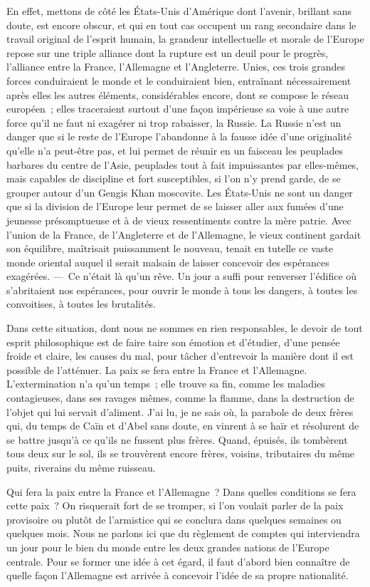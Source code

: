 \documentclass[french,twoside]{book} %
\begin{document}
En effet, mettons de côté les États-Unis d’Amérique dont l’avenir, brillant sans doute, est encore obscur, et qui en tout cas occupent un rang secondaire dans le travail original de l’esprit humain, la grandeur intellectuelle et morale de l’Europe repose sur une triple alliance dont la rupture est un deuil pour le progrès, l’alliance entre la France, l’Allemagne et l’Angleterre. Unies, ces trois grandes forces conduiraient le monde et le conduiraient bien, entraînant nécessairement après elles les autres éléments, considérables encore, dont se compose le réseau européen ; elles traceraient surtout d’une façon impérieuse sa voie à une autre force qu’il ne faut ni exagérer ni trop rabaisser, la Russie. La Russie n’est un danger que si le reste de l’Europe l’abandonne à la fausse idée d’une originalité qu’elle n’a peut-être pas, et lui permet de réunir en un faisceau les peuplades barbares du centre de l’Asie, peuplades tout à fait impuissantes par elles-mêmes, mais capables de discipline et fort susceptibles, si l’on n’y prend garde, de se grouper autour d’un Gengis Khan moscovite. Les États-Unis ne sont un danger que si la division de l’Europe leur permet de se laisser aller aux fumées d’une jeunesse présomptueuse et à de vieux ressentiments contre la mère patrie. Avec l’union de la France, de l’Angleterre et de l’Allemagne, le vieux continent gardait son équilibre, maîtrisait puissamment le nouveau, tenait en tutelle ce vaste monde oriental auquel il serait malsain de laisser concevoir des espérances exagérées. — Ce n’était là qu’un rêve. Un jour a suffi pour renverser l’édifice où s’abritaient nos espérances, pour ouvrir le monde à tous les dangers, à toutes les convoitises, à toutes les brutalités.\par
Dans cette situation, dont nous ne sommes en rien responsables, le devoir de tout esprit philosophique est de faire taire son émotion et d’étudier, d’une pensée froide et claire, les causes du mal, pour tâcher d’entrevoir la manière dont il est possible de l’atténuer. La paix se fera entre la France et l’Allemagne. L’extermination n’a qu’un temps ; elle trouve sa fin, comme les maladies contagieuses, dans ses ravages mêmes, comme la flamme, dans la destruction de l’objet qui lui servait d’aliment. J’ai lu, je ne sais où, la parabole de deux frères qui, du temps de Caïn et d’Abel sans doute, en vinrent à se haïr et résolurent de se battre jusqu’à ce qu’ils ne fussent plus frères. Quand, épuisés, ils tombèrent tous deux sur le sol, ils se trouvèrent encore frères, voisins, tributaires du même puits, riverains du même ruisseau.\par
Qui fera la paix entre la France et l’Allemagne ? Dans quelles conditions se fera cette paix ? On risquerait fort de se tromper, si l’on voulait parler de la paix provisoire ou plutôt de l’armistice qui se conclura dans quelques semaines ou quelques mois. Nous ne parlons ici que du règlement de comptes qui interviendra un jour pour le bien du monde entre les deux grandes nations de l’Europe centrale. Pour se former une idée à cet égard, il faut d’abord bien connaître de quelle façon l’Allemagne est arrivée à concevoir l’idée de sa propre nationalité.\par
\end{document}
